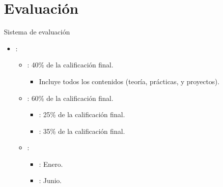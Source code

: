 \section{Evaluación}

\begin{frame}[t]{Sistema de evaluación}
\begin{itemize}
  \item {}:

  \begin{itemize}
    \item {}: 40\% de la calificación final.
      \begin{itemize}
        \item Incluye todos los contenidos (teoría, prácticas, y proyectos).
      \end{itemize}

    \item {}: 60\% de la calificación final.
      \begin{itemize}
        \item {}: 25\% de la calificación final.
        \item {}: 35\% de la calificación final.
      \end{itemize}
  \end{itemize}

  \begin{itemize}
    \item {}:
      \begin{itemize}
        \item {}: Enero.
        \item {}: Junio.
      \end{itemize}
  \end{itemize}
\end{itemize}
\end{frame}

